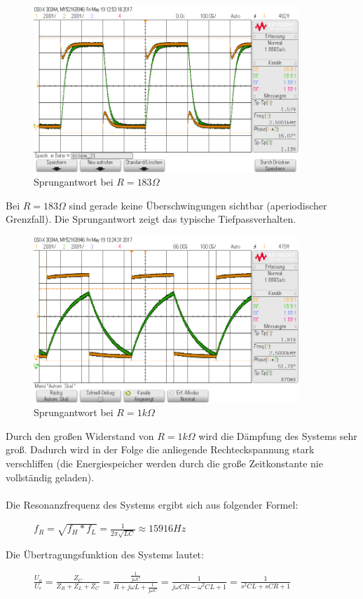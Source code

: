 \documentclass[12pt,a4paper,titlepage]{article}
\begin{document}
\begin{figure}[H]
  \centering
  \includegraphics[width=100mm]{sprungantwort_rlc_180.png}
  \caption{Sprungantwort bei $R=183\Omega$}
\end{figure}
\noindent Bei $R=183\Omega$ sind gerade keine \"Uberschwingungen sichtbar (aperiodischer Grenzfall). Die Sprungantwort zeigt das typische Tiefpassverhalten.

\begin{figure}[H]
  \centering
  \includegraphics[width=100mm]{sprungantwort_rlc_1k.png}
  \caption{Sprungantwort bei $R=1k\Omega$}
\end{figure}
\noindent Durch den großen Widerstand von $R=1k\Omega$ wird die D\"ampfung des Systems sehr groß. Dadurch wird in der Folge die anliegende Rechteckspannung stark verschliffen (die Energiespeicher werden durch die große Zeitkonstante nie vollst\"andig geladen).\\\\
Die Resonanzfrequenz des Systems ergibt sich aus folgender Formel:
\begin{figure}[H]
  \centering
  $f_R = \sqrt{f_H*f_L} = \frac{1}{2\pi\sqrt{LC}} \approx 15916Hz$
\end{figure}

\noindent Die \"Ubertragungsfunktion des Systems lautet:
\begin{figure}[H]
  \centering
  $\frac{U_a}{U_e} = \frac{Z_C}{Z_R+Z_L+Z_C} = \frac{\frac{1}{j\omega C}}{R+j\omega L+\frac{1}{j\omega C}} = \frac{1}{j\omega CR-\omega^2CL+1} = \frac{1}{s^2CL+sCR+1}$
\end{figure}
\end{document}
